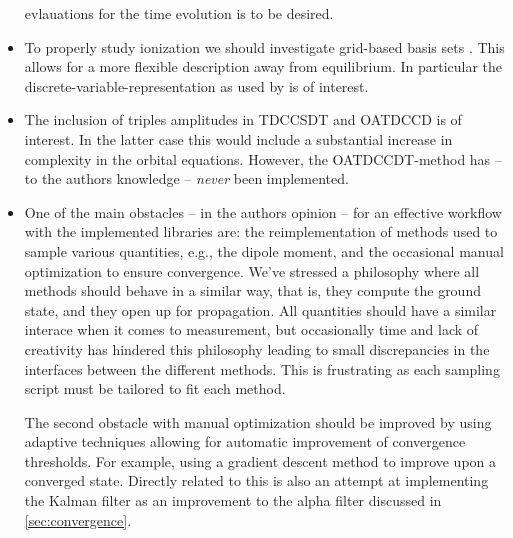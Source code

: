 \begin{itemize}
                    evlauations for the time evolution is to be desired.
                \item To properly study ionization we should investigate
                    grid-based basis sets \cite{takeshi, miyagi_and_madsen,
                    hochstuhl2014time}.
                    This allows for a more flexible description away from
                    equilibrium.
                    In particular the discrete-variable-representation as used
                    by \citeauthor{miyagi_and_madsen} \cite{miyagi_and_madsen}
                    is of interest.
                \item The inclusion of triples amplitudes in TDCCSDT and OATDCCD
                    is of interest.
                    In the latter case this would include a substantial
                    increase in complexity in the orbital equations.
                    However, the OATDCCDT-method has -- to the authors knowledge
                    -- \emph{never} been implemented.
                \item One of the main obstacles -- in the authors opinion -- for
                    an effective workflow with the implemented libraries are: the
                    reimplementation of methods used to sample various
                    quantities, e.g., the dipole moment, and the occasional
                    manual optimization to ensure convergence.
                    We've stressed a philosophy where all methods should behave
                    in a similar way, that is, they compute the ground state,
                    and they open up for propagation.
                    All quantities should have a similar interace when it comes
                    to measurement, but occasionally time and lack of creativity
                    has hindered this philosophy leading to small discrepancies
                    in the interfaces between the different methods.
                    This is frustrating as each sampling script must be tailored
                    to fit each method.

                    The second obstacle with manual optimization should be
                    improved by using adaptive techniques allowing for automatic
                    improvement of convergence thresholds.
                    For example, using a gradient descent method to improve upon
                    a converged state.
                    Directly related to this is also an attempt at implementing
                    the Kalman filter as an improvement to the alpha filter
                    discussed in \autoref{sec:convergence}.
            \end{itemize}

